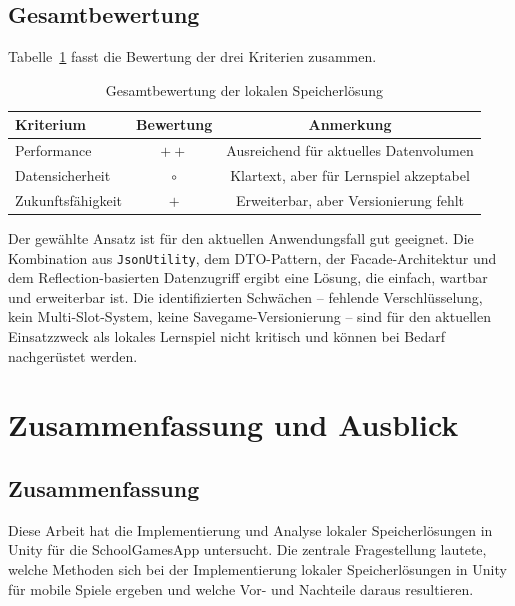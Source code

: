 \documentclass[12pt,a4paper]{article}
\begin{document}
\subsection{Gesamtbewertung}

Tabelle~\ref{tab:gesamtbewertung} fasst die Bewertung der drei Kriterien zusammen.

\begin{table}[H]
    \centering
    \begin{tabular}{lcc}
        \toprule
        \textbf{Kriterium} & \textbf{Bewertung} & \textbf{Anmerkung} \\
        \midrule
        Performance & $++$ & Ausreichend für aktuelles Datenvolumen \\
        Datensicherheit & $\circ$ & Klartext, aber für Lernspiel akzeptabel \\
        Zukunftsfähigkeit & $+$ & Erweiterbar, aber Versionierung fehlt \\
        \bottomrule
    \end{tabular}
    \caption{Gesamtbewertung der lokalen Speicherlösung}
    \label{tab:gesamtbewertung}
\end{table}

Der gewählte Ansatz ist für den aktuellen Anwendungsfall gut geeignet. Die Kombination aus \texttt{JsonUtility}, dem DTO-Pattern, der Facade-Architektur und dem Reflection-basierten Datenzugriff ergibt eine Lösung, die einfach, wartbar und erweiterbar ist. Die identifizierten Schwächen -- fehlende Verschlüsselung, kein Multi-Slot-System, keine Savegame-Versionierung -- sind für den aktuellen Einsatzzweck als lokales Lernspiel nicht kritisch und können bei Bedarf nachgerüstet werden.


\section{Zusammenfassung und Ausblick}

\subsection{Zusammenfassung}

Diese Arbeit hat die Implementierung und Analyse lokaler Speicherlösungen in Unity für die SchoolGamesApp untersucht. Die zentrale Fragestellung lautete, welche Methoden sich bei der Implementierung lokaler Speicherlösungen in Unity für mobile Spiele ergeben und welche Vor- und Nachteile daraus resultieren.
\end{document}

